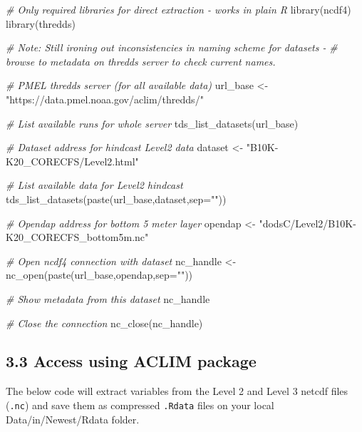 \documentclass[
]{article}
\newenvironment{Shaded}{\begin{snugshade}}{\end{snugshade}}
\newcommand{\AttributeTok}[1]{\textcolor[rgb]{0.77,0.63,0.00}{#1}}
\newcommand{\CommentTok}[1]{\textcolor[rgb]{0.56,0.35,0.01}{\textit{#1}}}
\newcommand{\FunctionTok}[1]{\textcolor[rgb]{0.00,0.00,0.00}{#1}}
\newcommand{\NormalTok}[1]{#1}
\newcommand{\OtherTok}[1]{\textcolor[rgb]{0.56,0.35,0.01}{#1}}
\newcommand{\StringTok}[1]{\textcolor[rgb]{0.31,0.60,0.02}{#1}}
\begin{document}
\begin{Shaded}
\begin{Highlighting}[]
    \CommentTok{\# Only required libraries for direct extraction {-} works in plain R}
    \FunctionTok{library}\NormalTok{(ncdf4)}
    \FunctionTok{library}\NormalTok{(thredds)                          }

    \CommentTok{\# Note: Still ironing out inconsistencies in naming scheme for datasets {-}}
    \CommentTok{\# browse to metadata on thredds server to check current names.}

    \CommentTok{\# PMEL thredds server (for all available data)}
\NormalTok{    url\_base }\OtherTok{\textless{}{-}} \StringTok{"https://data.pmel.noaa.gov/aclim/thredds/"}

    \CommentTok{\# List available runs for whole server}
    \FunctionTok{tds\_list\_datasets}\NormalTok{(url\_base)}

    \CommentTok{\# Dataset address for hindcast Level2 data}
\NormalTok{    dataset  }\OtherTok{\textless{}{-}} \StringTok{"B10K{-}K20\_CORECFS/Level2.html"}
 
    \CommentTok{\# List available data for Level2 hindcast}
    \FunctionTok{tds\_list\_datasets}\NormalTok{(}\FunctionTok{paste}\NormalTok{(url\_base,dataset,}\AttributeTok{sep=}\StringTok{""}\NormalTok{))}

    \CommentTok{\# Opendap address for bottom 5 meter layer}
\NormalTok{    opendap  }\OtherTok{\textless{}{-}} \StringTok{"dodsC/Level2/B10K{-}K20\_CORECFS\_bottom5m.nc"}

    \CommentTok{\# Open ncdf4 connection with dataset}
\NormalTok{    nc\_handle }\OtherTok{\textless{}{-}} \FunctionTok{nc\_open}\NormalTok{(}\FunctionTok{paste}\NormalTok{(url\_base,opendap,}\AttributeTok{sep=}\StringTok{""}\NormalTok{)) }

    \CommentTok{\# Show metadata from this dataset}
\NormalTok{    nc\_handle}

    \CommentTok{\# Close the connection}
    \FunctionTok{nc\_close}\NormalTok{(nc\_handle)}
\end{Highlighting}
\end{Shaded}

\hypertarget{access-using-aclim-package}{%
\subsection{3.3 Access using ACLIM
package}\label{access-using-aclim-package}}

The below code will extract variables from the Level 2 and Level 3
netcdf files (\texttt{.nc}) and save them as compressed \texttt{.Rdata}
files on your local Data/in/Newest/Rdata folder.
\end{document}
